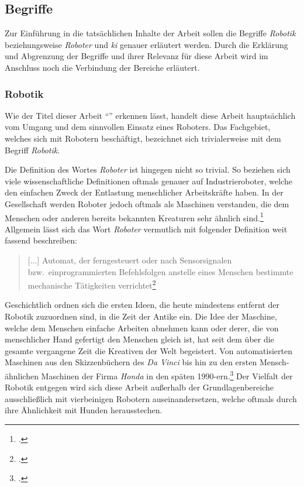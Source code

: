 \subsection{Begriffe}
\label{subsec:begriffe}

Zur Einführung in die tatsächlichen Inhalte der Arbeit sollen die Begriffe \emph{Robotik} beziehungsweise \emph{Roboter} und \emph{\gls{ki}} genauer erläutert werden.
Durch die Erklärung und Abgrenzung der Begriffe und ihrer Relevanz für diese Arbeit wird im Anschluss noch die Verbindung der Bereiche erläutert.

\subsubsection{Robotik}
Wie der Titel dieser Arbeit \enquote{\mytitle} erkennen lässt, handelt diese Arbeit hauptsächlich vom Umgang und dem sinnvollen Einsatz eines Roboters.
Das Fachgebiet, welches sich mit Robotern beschäftigt, bezeichnet sich trivialerweise mit dem Begriff \emph{Robotik}.

Die Definition des Wortes \emph{Roboter} ist hingegen nicht so trivial.
So beziehen sich viele wissenschaftliche Definitionen oftmals genauer auf Industrieroboter, welche den einfachen Zweck der Entlastung menschlicher Arbeitskräfte haben.
In der Gesellschaft werden Roboter jedoch oftmals als Maschinen verstanden, die dem Menschen oder anderen bereits bekannten Kreaturen sehr ähnlich sind.\footcite{grundlagen_der_robotik}
Allgemein lässt sich das Wort \emph{Roboter} vermutlich mit folgender Definition weit fassend beschreiben:

\begin{quote}
    [...] Automat, der ferngesteuert oder nach Sensorsignalen bzw.\ einprogrammierten Befehlsfolgen anstelle eines Menschen bestimmte mechanische Tätigkeiten verrichtet\footcite{duden_roboter}
\end{quote}


Geschichtlich ordnen sich die ersten Ideen, die heute mindestens entfernt der Robotik zuzuordnen sind, in die Zeit der Antike ein.
Die Idee der Maschine, welche dem Menschen einfache Arbeiten abnehmen kann oder derer, die von menschlicher Hand gefertigt den Menschen gleich ist, hat seit dem über die gesamte vergangene Zeit die Kreativen der Welt begeistert.
Von automatisierten Maschinen aus den Skizzenbüchern des \emph{Da Vinci} bis hin zu den ersten Mensch-ähnlichen Maschinen der Firma \emph{Honda} in den späten \num{1990}-ern.\footcite{grundlagen_der_robotik}
Der Vielfalt der Robotik entgegen wird sich diese Arbeit außerhalb der Grundlagenbereiche ausschließlich mit vierbeinigen Robotern auseinandersetzen, welche oftmals durch ihre Ähnlichkeit mit Hunden herausstechen.


